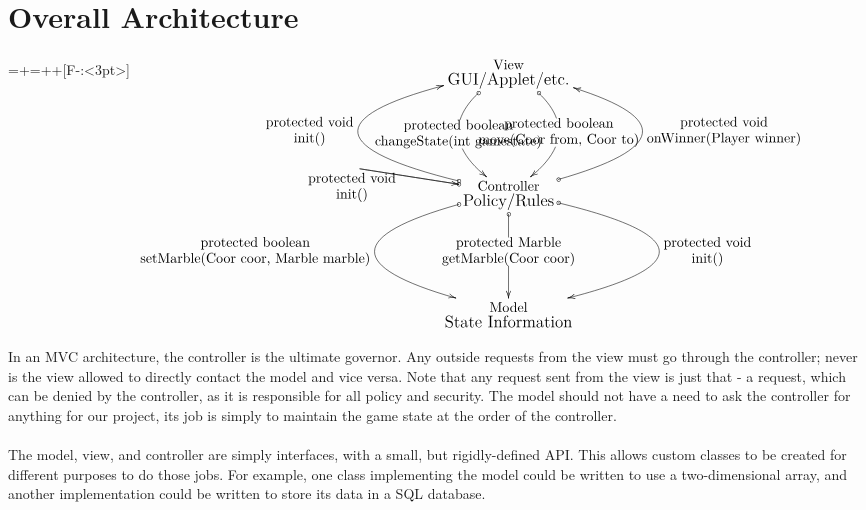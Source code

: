 \documentclass{article}
\title{}
\author{}
\date{}
\begin{document}

\section{Overall Architecture}

\entrymodifiers={+=++[F-:<3pt>]}
\Huge
$\xymatrix @R+3pc
{
\txt{View\\ {\large GUI/Applet/etc.} }
\ar@{o->}@/^3pc/[d]|<(.4){\normalsize \txt{protected boolean\\ move(Coor from, Coor to)}}
\ar@{o->}@/_3pc/[d]|>(.6){\normalsize \txt{protected boolean\\ changeState(int gamestate)}}\\
\ar@{o->}@/^9pc/[u]^{\normalsize \txt{protected void\\ init()}}
\ar@{o->}@/_8pc/[u]_{\normalsize \txt{protected void\\ onWinner(Player winner)}}
\txt{Controller\\ {\large Policy/Rules}}
\ar@{o->}@/^9pc/[]^{\normalsize \txt{protected void\\ init()}}
\ar@{o->}@/^9pc/[d]^{\normalsize \txt{protected void\\ init()}}
\ar@{o->}[d]|{\normalsize \txt{protected Marble\\ getMarble(Coor coor)}}
\ar@{o->}@/_8pc/[d]_{\normalsize \txt{protected boolean\\ setMarble(Coor coor, Marble marble)}}\\
\txt{Model\\ {\large State Information} }\\
}$
\normalsize

In an MVC architecture, the controller is the ultimate governor. Any outside requests from the view must go through the controller; never is the view allowed to directly contact the model and vice versa. Note that any request sent from the view is just that - a request, which can be denied by the controller, as it is responsible for all policy and security. The model should not have a need to ask the controller for anything for our project, its job is simply to maintain the game state at the order of the controller.\\\\

The model, view, and controller are simply interfaces, with a small, but rigidly-defined API. This allows custom classes to be created for different purposes to do those jobs. For example, one class implementing the model could be written to use a two-dimensional array, and another implementation could be written to store its data in a SQL database.\\\\
\end{document}
